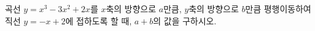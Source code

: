 곡선 $y=x^3-3x^2+2x$를 $x$축의 방향으로 $a$만큼, $y$축의 방향으로 $b$만큼 평행이동하여 직선 $y=-x+2$에 접하도록 할 때, $a+b$의 값을 구하시오.
